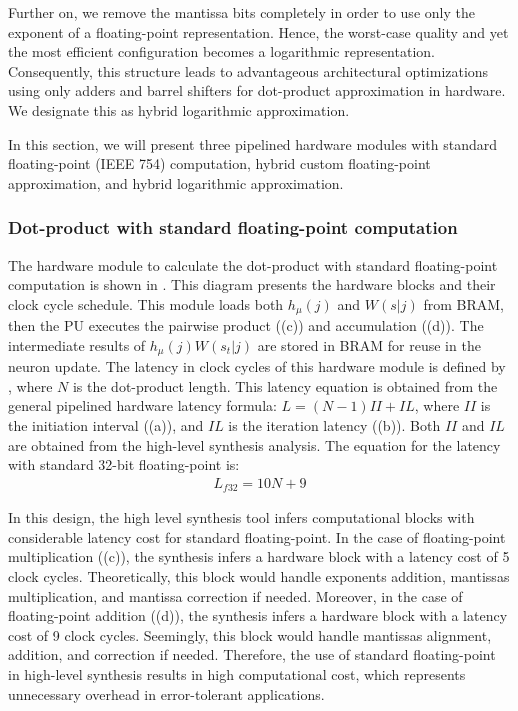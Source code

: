 Further on, we remove the mantissa bits completely in order to use only the exponent of a floating-point representation. Hence, the worst-case quality and yet the most efficient configuration becomes a logarithmic representation. Consequently, this structure leads to advantageous architectural optimizations using only adders and barrel shifters for dot-product approximation in hardware. We designate this as hybrid logarithmic approximation.

In this section, we will present three pipelined hardware modules with standard floating-point (IEEE 754) computation, hybrid custom floating-point approximation, and hybrid logarithmic approximation.

\subsubsection{Dot-product with standard floating-point computation}
 The hardware module to calculate the dot-product with standard floating-point computation is shown in . This diagram presents the hardware blocks and their clock cycle schedule. This module loads both $h_\mu(j)$ and $W(s|j)$ from BRAM, then the PU executes the pairwise product ((c)) and accumulation ((d)). The intermediate results of $h_\mu(j) W(s_t|j)$ are stored in BRAM for reuse in the neuron update. The latency in clock cycles of this hardware module is defined by , where $N$ is the dot-product length. This latency equation is obtained from the general pipelined hardware latency formula: $L=\left(N-1\right)II+IL$, where $II$ is the initiation interval ((a)), and $IL$ is the iteration latency ((b)). Both $II$ and $IL$ are obtained from the high-level synthesis analysis. The equation for the latency with standard 32-bit floating-point is:
 \begin{eqnarray} \label{eq:dot_standard_float_latency}
 L_{f32}=10N+9
 \end{eqnarray}
 
In this design, the high level synthesis tool infers computational blocks with considerable latency cost for standard floating-point. In the case of floating-point multiplication ((c)), the synthesis infers a hardware block with a latency cost of 5 clock cycles. Theoretically, this block would handle exponents addition, mantissas multiplication, and mantissa correction if needed. Moreover, in the case of floating-point addition ((d)), the synthesis infers a hardware block with a latency cost of 9 clock cycles. Seemingly, this block would handle mantissas alignment, addition, and correction if needed. Therefore, the use of standard floating-point in high-level synthesis results in high computational cost, which represents unnecessary overhead in error-tolerant applications.



